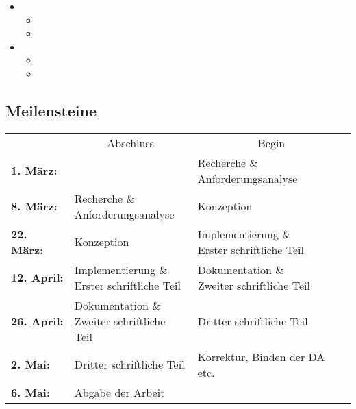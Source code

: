 \begin{itemize}
\begin{itemize}
\begin{itemize}
          \end{itemize}
        \item {}
          \begin{itemize}
            \item {}
            \item {}
          \end{itemize}
        \item {}
          \begin{itemize}
            \item {}
            \item {}
          \end{itemize}
      \end{itemize}
  \end{itemize}

  \subsection{Meilensteine}
  \label{ssec:meilensteine}
    \begin{table}[H]
      \begin{tabularx}{\textwidth}{lXX}
        {}
          & \multicolumn{1}{c}{Abschluss}
            & \multicolumn{1}{c}{Begin}\\
        \cline{2-3}
        \textbf{1. März:}
          & {}
            & \specialcell[t]{Recherche \&\\Anforderungsanalyse}\\
        \textbf{8. März:}
          & \specialcell[t]{Recherche \&\\Anforderungsanalyse}
            & Konzeption\\
        \textbf{22. März:}
          & Konzeption
            & \specialcell[t]{Implementierung \&\\Erster schriftliche Teil}\\
        \textbf{12. April:}
          & \specialcell[t]{Implementierung \&\\Erster schriftliche Teil}
            & \specialcell[t]{Dokumentation \&\\Zweiter schriftliche Teil}\\
        \textbf{26. April:}
          & \specialcell[t]{Dokumentation \&\\Zweiter schriftliche Teil}
            & Dritter schriftliche Teil\\
        \textbf{2. Mai:}
          & Dritter schriftliche Teil
            & Korrektur, Binden der DA etc.\\
        \textbf{6. Mai:}
          & Abgabe der Arbeit
            &\\
      \end{tabularx}
    \end{table}

